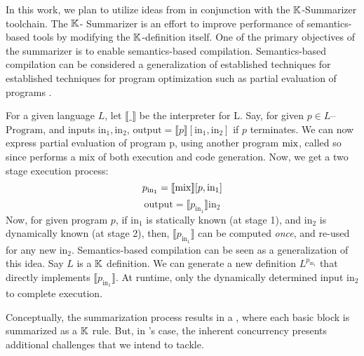 
In this work, we plan to utilize ideas from \cite{KoppelICFP22}
in conjunction with the $\mathbb{K}{}$-Summarizer toolchain. The $\mathbb{K}{}$-
Summarizer is an effort to improve performance of semantics-based tools
by modifying the $\mathbb{K}$-definition itself. One of the primary objectives
of the summarizer is to enable semantics-based compilation.
Semantics-based compilation can be considered a generalization of
established techniques for established techniques for program optimization
such as partial evaluation of programs \cite{Jones93Book}.

For a given language $L$, let $\llbracket\_\rrbracket$ be the
interpreter for L. Say, for given $p \in L$--$\text{Program}$, and inputs
$\text{in}_1, \text{in}_2$,
$\text{output} = \llbracket p \rrbracket\left[\text{in}_1,\text{in}_2\right]$
if $p$ terminates.
We can now express partial evaluation of program p, using another
program $\text{mix}$, called so since performs a mix of both execution and code
generation. Now, we get a two stage execution process:
$$ p_{\text{in}_1} = \llbracket \text{mix} \rrbracket [p, \text{in}_1]$$
$$ \text{output} = \llbracket p_{\text{in}_1} \rrbracket \text{in}_2$$
Now, for given program $p$, if $\text{in}_1$ is statically known (at stage 1),
and $\text{in}_2$ is dynamically known (at stage 2), then,
$\llbracket p_{\text{in}_1} \rrbracket$ can be computed \emph{once}, and
re-used for any new $\text{in}_2$.
Semantics-based compilation can be seen as a generalization of this idea.
Say $L$ is a $\mathbb{K}$ definition. We can generate a new definition
$L^{p_{\text{in}_1}}$ that directly implements $\llbracket p_{\text{in}_1}
\rrbracket$. At runtime, only the dynamically determined input $\text{in}_2$
to complete execution.

Conceptually, the summarization process results in a \CFG{}, where
each basic block is summarized as a $\mathbb{K}$ rule. But, in \MediK{}'s
case, the inherent concurrency presents additional challenges
that we intend to tackle.

